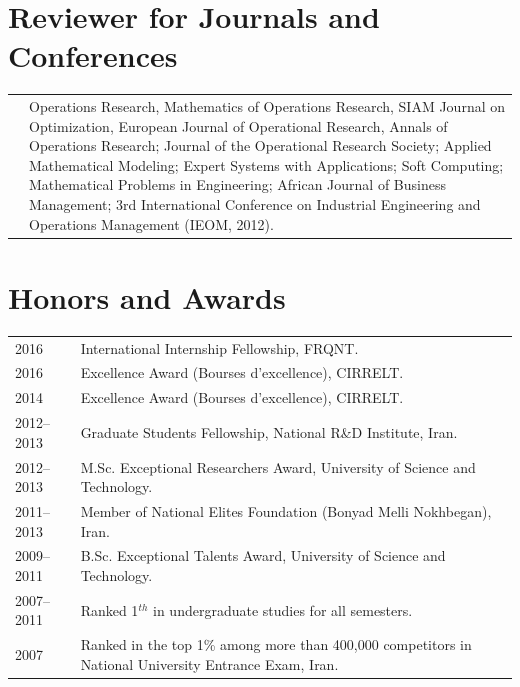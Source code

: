 \documentclass[10PT,letter]{article}
\newcommand{\numbox}[1]{} %
\begin{document}
\section*{\numbox{6}\bfseries\textcolor{titlecol}{\sffamily Reviewer  for Journals and Conferences}}
\begin{tabular}{lp{6.5in}}
	   & Operations Research, Mathematics of Operations Research, SIAM Journal on Optimization, European Journal of Operational Research, Annals of Operations Research; Journal of the Operational Research Society; Applied Mathematical Modeling; Expert Systems with Applications; Soft Computing; Mathematical Problems in Engineering; African Journal of Business Management; 3rd International Conference on Industrial Engineering and Operations Management (IEOM, 2012).
 \end{tabular}

\section*{\numbox{6}\bfseries\textcolor{titlecol}{\sffamily Honors and Awards}}

		\begin{tabular}{p{1.2in}p{5.95in}}
			\textsc{2016} & International Internship Fellowship, FRQNT. \\[1mm]
			\textsc{2016} & Excellence Award (Bourses d'excellence), CIRRELT. \\[1mm] 
			\textsc{2014} & Excellence Award (Bourses d'excellence), CIRRELT. \\[1mm] 
			\textsc{2012--2013} & Graduate Students Fellowship, National R\&D Institute,  Iran.\\[1mm]
			\textsc{2012--2013} & M.Sc. Exceptional Researchers Award, University of Science and Technology.\\[1mm]
			\textsc{2011--2013} & Member of  National Elites Foundation (Bonyad Melli Nokhbegan), Iran.\\[1mm]
			\textsc{2009--2011} & B.Sc. Exceptional Talents Award,  University of Science and Technology.\\[1mm]
			\textsc{2007--2011} & Ranked 1$^{th}$ in undergraduate studies for all semesters.\\[1mm]
				\textsc{2007} & Ranked in the top 1\% among more than 400,000 competitors in National University Entrance Exam, Iran.\\[1mm]
		\end{tabular}
\end{document}
